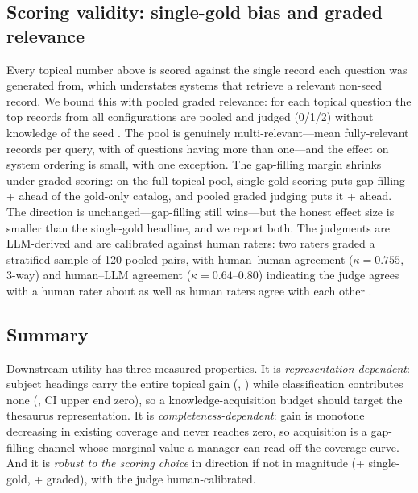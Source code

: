 \subsection{Scoring validity: single-gold bias and graded relevance}

Every topical number above is scored against the single record each question
was generated from, which understates systems that retrieve a relevant
non-seed record. We bound this with pooled graded relevance: for each
topical question the top records from all configurations are pooled and
judged (0/1/2) without knowledge of the seed
. The pool is genuinely
multi-relevant---mean \PoolMeanRel{} fully-relevant records per query, with
\PoolMultiRel{} of \PoolNQueries{} questions having more than one---and the
effect on system ordering is small, with one exception. The gap-filling
margin shrinks under graded scoring: on the full topical pool,
single-gold scoring puts gap-filling +\PoolSingleEnrGain{} ahead of the
gold-only catalog, and pooled graded judging puts it +\PoolEnrGain{} ahead.
The direction is unchanged---gap-filling still wins---but the honest effect
size is smaller than the single-gold headline, and we report both. The
judgments are LLM-derived and are calibrated against human raters: two
raters graded a stratified sample of 120 pooled pairs, with human--human
agreement ($\kappa=0.755$, 3-way) and human--LLM agreement
($\kappa=0.64$--$0.80$) indicating the judge agrees with a human rater
about as well as human raters agree with each other
.

\subsection{Summary}

Downstream utility has three measured properties. It is
\emph{representation-dependent}: subject headings carry the entire topical
gain (\AblSubjGain{}, \AblSubjP{}) while classification contributes none
(\AblDdcGain{}, CI upper end zero), so a knowledge-acquisition budget should
target the thesaurus representation. It is \emph{completeness-dependent}:
gain is monotone decreasing in existing coverage and never reaches zero, so
acquisition is a gap-filling channel whose marginal value a manager can read
off the coverage curve. And it is \emph{robust to the scoring choice} in
direction if not in magnitude (+\PoolSingleEnrGain{} single-gold,
+\PoolEnrGain{} graded), with the judge human-calibrated.
